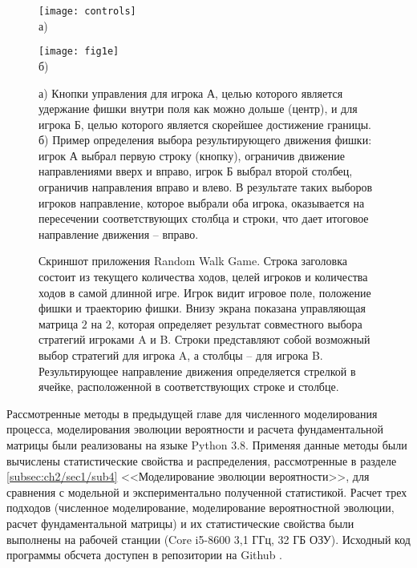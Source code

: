 \begin{figure}[ht]
    \begin{minipage}[b][][b]{0.49\linewidth}\centering
        \texttt{[image: controls]} \\ а)
    \end{minipage}
    \hfill
    \begin{minipage}[b][][b]{0.49\linewidth}\centering
        \texttt{[image: fig1e]} \\ б)
    \end{minipage}
    \caption{
        а) Кнопки управления для игрока А, целью которого является удержание фишки внутри поля как можно дольше (центр),
        и для игрока Б, целью которого является скорейшее достижение границы.
        б) Пример определения выбора результирующего движения фишки: игрок А выбрал первую строку (кнопку), ограничив движение направлениями вверх и вправо,
        игрок Б выбрал второй столбец, ограничив направления вправо и влево. В результате таких выборов игроков направление, которое выбрали оба игрока,
        оказывается на пересечении соответствующих столбца и строки, что дает итоговое направление движения -- вправо.
    }\label{fig:controls}
\end{figure}


\begin{figure}[ht]
    \caption{
        Скриншот приложения Random Walk Game. Строка заголовка состоит из текущего количества ходов, 
        целей игроков и количества ходов в самой длинной игре. Игрок видит игровое поле, положение фишки и траекторию фишки. 
        Внизу экрана показана управляющая матрица $2$ на $2$, которая определяет результат совместного выбора стратегий игроками A и B. 
        Строки представляют собой возможный выбор стратегий для игрока A, а столбцы -- для игрока B. Результирующее направление движения 
        определяется стрелкой в ячейке, расположенной в соответствующих строке и столбце.
    }\label{fig:screenshot_game_field}
\end{figure}










Рассмотренные методы в предыдущей главе для численного моделирования процесса,
моделирования эволюции вероятности и расчета фундаментальной матрицы 
были реализованы на языке Python 3.8. 
Применяя данные методы были вычислены статистические свойства и распределения, 
рассмотренные в разделе \cref{subsec:ch2/sec1/sub4} <<Моделирование эволюции вероятности>>, для сравнения с модельной и экспериментально полученной статистикой. 
Расчет трех подходов (численное моделирование, моделирование вероятностной эволюции, расчет фундаментальной матрицы) 
и их статистические свойства были выполнены на рабочей станции (Core i5-8600 3,1 ГГц, 32 ГБ ОЗУ). 
Исходный код программы обсчета доступен в репозитории на Github \cite{RWAnalyzer}.

